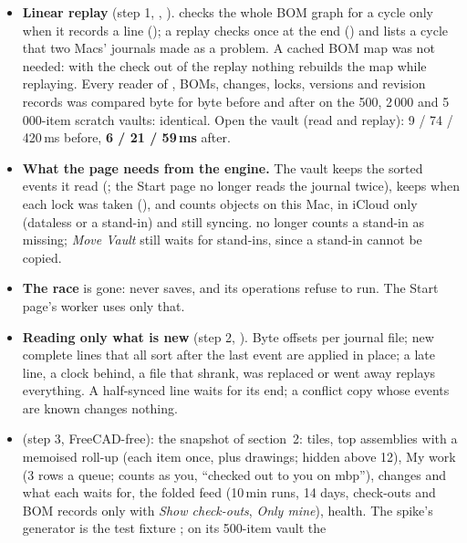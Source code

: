 \begin{itemize}[nosep]
  \item \textbf{Linear replay} (step 1, , ).  checks the whole BOM
        graph for a cycle only when it records a line (); a replay checks once at the end
        () and lists a cycle that two Macs' journals made as a problem. A cached BOM map was
        not needed: with the check out of the replay nothing rebuilds the map while replaying. Every reader of
        , BOMs, changes, locks, versions and revision records was compared byte for byte before and
        after on the 500, 2\,000 and 5\,000-item scratch vaults: identical. Open the vault (read and replay):
        9 / 74 / 420\,ms before, \textbf{6 / 21 / 59\,ms} after.
  \item \textbf{What the page needs from the engine.} The vault keeps the sorted events it read (; the
        Start page no longer reads the journal twice), keeps when each lock was taken (), and
         counts objects on this Mac, in iCloud only (dataless or a  stand-in) and
        still syncing.  no longer counts a stand-in as missing; \emph{Move Vault} still waits
        for stand-ins, since a stand-in cannot be copied.
  \item \textbf{The  race} is gone:  never saves, and its
        operations refuse to run. The Start page's worker uses only that.
  \item \textbf{Reading only what is new} (step 2, ). Byte offsets per journal file; new
        complete lines that all sort after the last event are applied in place; a late line, a clock behind, a file
        that shrank, was replaced or went away replays everything. A half-synced line waits for its end; a conflict
        copy whose events are known changes nothing.
  \item \textbf{} (step 3, FreeCAD-free): the snapshot of section~2: tiles, top
        assemblies with a memoised roll-up (each item once, plus drawings; hidden above 12), My work (3 rows a queue;
         counts as you, ``checked out to you on mbp''), changes and what each waits for, the folded
        feed (10\,min runs, 14 days, check-outs and BOM records only with \emph{Show check-outs}, \emph{Only mine}),
        health. The spike's generator is the test fixture ; on its 500-item vault the

\end{itemize}
